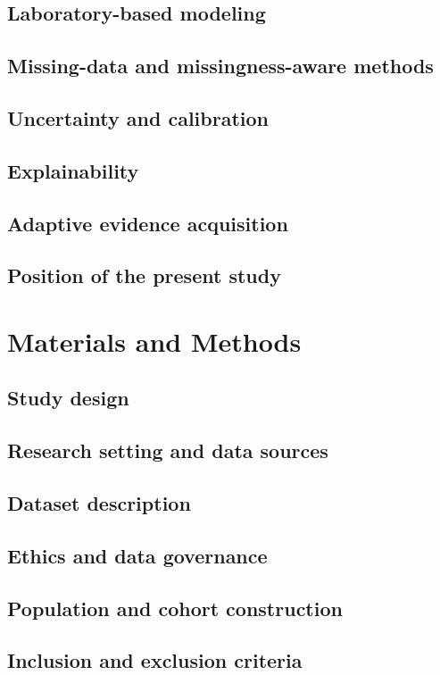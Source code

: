 \documentclass[10pt,journal]{IEEEtran}
\begin{document}
\subsection{Laboratory-based modeling}
\subsection{Missing-data and missingness-aware methods}
\subsection{Uncertainty and calibration}
\subsection{Explainability}
\subsection{Adaptive evidence acquisition}
\subsection{Position of the present study}

\section{Materials and Methods}
\subsection{Study design}
\subsection{Research setting and data sources}
\subsection{Dataset description}
\subsection{Ethics and data governance}
\subsection{Population and cohort construction}
\subsection{Inclusion and exclusion criteria}
\end{document}
